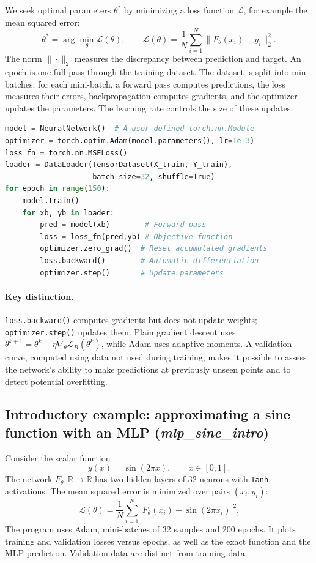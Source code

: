 \documentclass[11pt,a4paper]{article}
\begin{document}
We seek optimal parameters $\theta^*$ by minimizing a loss function $\mathcal L$, for example the mean squared error:
\[
\boxed{\theta^*=\arg\min_\theta\mathcal L(\theta),\qquad
\mathcal L(\theta)=\frac{1}{N}\sum_{i=1}^N\|F_\theta(x_i)-y_i\|_2^2.}
\]
The norm $\|\cdot\|_2$ measures the discrepancy between prediction and target. An epoch is one full pass through the training dataset. The dataset is split into mini-batches; for each mini-batch, a forward pass computes predictions, the loss measures their errors, backpropagation computes gradients, and the optimizer updates the parameters. The learning rate controls the size of these updates.
\begin{lstlisting}[language=Python]
model = NeuralNetwork()  # A user-defined torch.nn.Module
optimizer = torch.optim.Adam(model.parameters(), lr=1e-3)
loss_fn = torch.nn.MSELoss()
loader = DataLoader(TensorDataset(X_train, Y_train),
                    batch_size=32, shuffle=True)
for epoch in range(150):
    model.train()
    for xb, yb in loader:
        pred = model(xb)        # Forward pass
        loss = loss_fn(pred,yb) # Objective function
        optimizer.zero_grad()  # Reset accumulated gradients
        loss.backward()        # Automatic differentiation
        optimizer.step()       # Update parameters
\end{lstlisting}
\paragraph{Key distinction.} \texttt{loss.backward()} computes gradients but does not update weights; \texttt{optimizer.step()} updates them. Plain gradient descent uses $\theta^{k+1}=\theta^k-\eta\nabla_\theta\mathcal L_B(\theta^k)$, while Adam uses adaptive moments. A validation curve, computed using data not used during training, makes it possible to assess the network's ability to make predictions at previously unseen points and to detect potential overfitting.

\subsection{Introductory example: approximating a sine function with an MLP (\textit{mlp\_sine\_intro})}

Consider the scalar function
\[y(x)=\sin(2\pi x),\qquad x\in[0,1].\]
The network $F_\theta:\mathbb R\to\mathbb R$ has two hidden layers of 32 neurons with \texttt{Tanh} activations. The mean squared error is minimized over pairs $(x_i,y_i)$:
\[\mathcal L(\theta)=\frac1N\sum_{i=1}^{N}|F_\theta(x_i)-\sin(2\pi x_i)|^2.\]
The program uses Adam, mini-batches of 32 samples and 200 epochs. It plots training and validation losses versus epochs, as well as the exact function and the MLP prediction. Validation data are distinct from training data.
\end{document}
